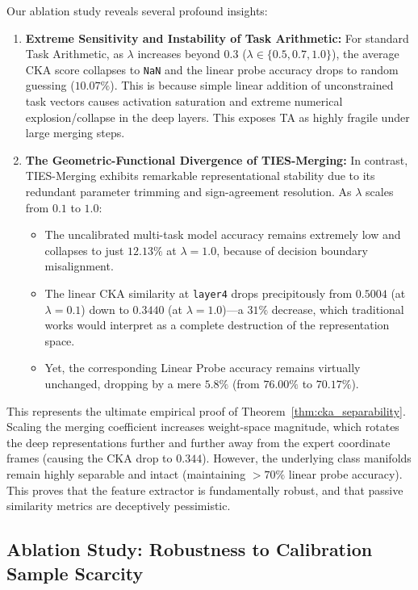 \documentclass{article}
\theoremstyle{plain}
\theoremstyle{definition}
\theoremstyle{remark}
\begin{document}
Our ablation study reveals several profound insights:
\begin{enumerate}
  \item \textbf{Extreme Sensitivity and Instability of Task Arithmetic:} For standard Task Arithmetic, as $\lambda$ increases beyond $0.3$ ($\lambda \in \{0.5, 0.7, 1.0\}$), the average CKA score collapses to \texttt{NaN} and the linear probe accuracy drops to random guessing ($10.07\%$). This is because simple linear addition of unconstrained task vectors causes activation saturation and extreme numerical explosion/collapse in the deep layers. This exposes TA as highly fragile under large merging steps.
  \item \textbf{The Geometric-Functional Divergence of TIES-Merging:} In contrast, TIES-Merging exhibits remarkable representational stability due to its redundant parameter trimming and sign-agreement resolution. As $\lambda$ scales from $0.1$ to $1.0$:
  \begin{itemize}
    \item The uncalibrated multi-task model accuracy remains extremely low and collapses to just $12.13\%$ at $\lambda=1.0$, because of decision boundary misalignment.
    \item The linear CKA similarity at \texttt{layer4} drops precipitously from $0.5004$ (at $\lambda=0.1$) down to \textbf{$0.3440$} (at $\lambda=1.0$)---a $31\%$ decrease, which traditional works would interpret as a complete destruction of the representation space.
    \item Yet, the corresponding Linear Probe accuracy remains virtually unchanged, dropping by a mere $5.8\%$ (from \textbf{$76.00\%$} to \textbf{$70.17\%$}).
  \end{itemize}
\end{enumerate}

This represents the ultimate empirical proof of Theorem~\ref{thm:cka_separability}. Scaling the merging coefficient increases weight-space magnitude, which rotates the deep representations further and further away from the expert coordinate frames (causing the CKA drop to $0.344$). However, the underlying class manifolds remain highly separable and intact (maintaining $> 70\%$ linear probe accuracy). This proves that the feature extractor is fundamentally robust, and that passive similarity metrics are deceptively pessimistic.

\subsection{Ablation Study: Robustness to Calibration Sample Scarcity}
\label{sec:ablation_calib}
\end{document}
